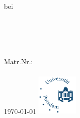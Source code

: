 \begin{titlepage}
\thispagestyle{empty}
	\begin{flushleft} \large
		\fak\\
		\lehrstuhl\\
		\lv \\
		\semester \\
		bei \lp \\[5cm]
	\end{flushleft}
	\begin{center}
		{\Large \sc \arbtyp \\[1.5cm]}
		{\Huge \bf \textsf{\titel} \\[1.5cm]}
		{\Large{
			\autorname\\
			\href{mailto:\autormail}{\autormail}\\
			Matr.Nr.: \autormatr}
			\\\textsf{}}\\			
		{\today}
		\vfill
		\includegraphics[width=2cm]{uni_potsdam_logo}\\ 
	\end{center}
\end{titlepage}
